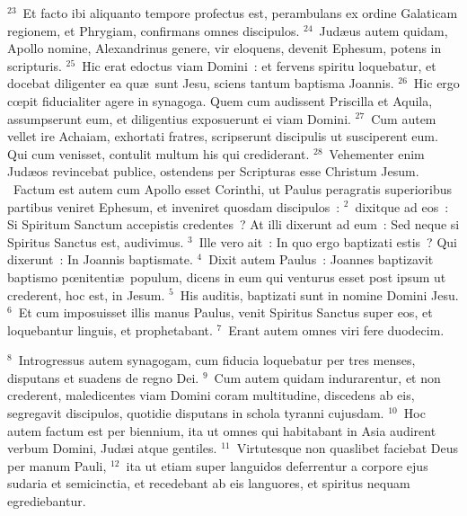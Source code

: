 ${}^{23}$~Et facto ibi aliquanto tempore profectus est, perambulans ex ordine Galaticam regionem, et Phrygiam, confirmans omnes discipulos.
${}^{24}$~Jud\ae us autem quidam, Apollo nomine, Alexandrinus genere, vir eloquens, devenit Ephesum, potens in scripturis.
${}^{25}$~Hic erat edoctus viam Domini~: et fervens spiritu loquebatur, et docebat diligenter ea qu\ae\ sunt Jesu, sciens tantum baptisma Joannis.
${}^{26}$~Hic ergo cœpit fiducialiter agere in synagoga. Quem cum audissent Priscilla et Aquila, assumpserunt eum, et diligentius exposuerunt ei viam Domini.
${}^{27}$~Cum autem vellet ire Achaiam, exhortati fratres, scripserunt discipulis ut susciperent eum. Qui cum venisset, contulit multum his qui crediderant.
${}^{28}$~Vehementer enim Jud\ae os revincebat publice, ostendens per Scripturas esse Christum Jesum.
~Factum est autem cum Apollo esset Corinthi, ut Paulus peragratis superioribus partibus veniret Ephesum, et inveniret quosdam discipulos~:
${}^{2}$~dixitque ad eos~: Si Spiritum Sanctum accepistis credentes~? At illi dixerunt ad eum~: Sed neque si Spiritus Sanctus est, audivimus.
${}^{3}$~Ille vero ait~: In quo ergo baptizati estis~? Qui dixerunt~: In Joannis baptismate.
${}^{4}$~Dixit autem Paulus~: Joannes baptizavit baptismo pœnitenti\ae\ populum, dicens in eum qui venturus esset post ipsum ut crederent, hoc est, in Jesum.
${}^{5}$~His auditis, baptizati sunt in nomine Domini Jesu.
${}^{6}$~Et cum imposuisset illis manus Paulus, venit Spiritus Sanctus super eos, et loquebantur linguis, et prophetabant.
${}^{7}$~Erant autem omnes viri fere duodecim.


${}^{8}$~Introgressus autem synagogam, cum fiducia loquebatur per tres menses, disputans et suadens de regno Dei.
${}^{9}$~Cum autem quidam indurarentur, et non crederent, maledicentes viam Domini coram multitudine, discedens ab eis, segregavit discipulos, quotidie disputans in schola tyranni cujusdam.
${}^{10}$~Hoc autem factum est per biennium, ita ut omnes qui habitabant in Asia audirent verbum Domini, Jud\ae i atque gentiles.
${}^{11}$~Virtutesque non quaslibet faciebat Deus per manum Pauli,
${}^{12}$~ita ut etiam super languidos deferrentur a corpore ejus sudaria et semicinctia, et recedebant ab eis languores, et spiritus nequam egrediebantur.


